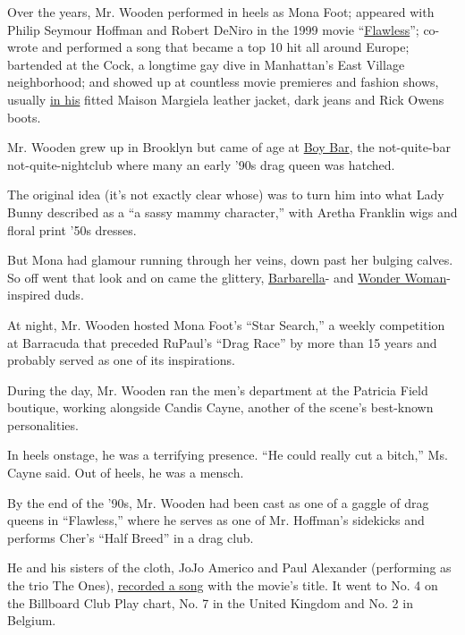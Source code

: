 Over the years, Mr. Wooden performed in heels as Mona Foot; appeared
with Philip Seymour Hoffman and Robert DeNiro in the 1999 movie
``\href{https://archive.nytimes3xbfgragh.onion/www.nytimes3xbfgragh.onion/library/film/112499flaw-film-review.html}{Flawless}'';
co-wrote and performed a song that became a top 10 hit all around
Europe; bartended at the Cock, a longtime gay dive in Manhattan's East
Village neighborhood; and showed up at countless movie premieres and
fashion shows, usually
\href{https://www.instagram.com/p/B-GGYGwjffJ/}{in his} fitted Maison
Margiela leather jacket, dark jeans and Rick Owens boots.

Mr. Wooden grew up in Brooklyn but came of age at
\href{https://www.nytimes3xbfgragh.onion/2018/06/20/style/new-york-gay-bars-that-are-gone.html}{Boy
Bar}, the not-quite-bar not-quite-nightclub where many an early '90s
drag queen was hatched.

The original idea (it's not exactly clear whose) was to turn him into
what Lady Bunny described as a ``a sassy mammy character,'' with Aretha
Franklin wigs and floral print '50s dresses.

But Mona had glamour running through her veins, down past her bulging
calves. So off went that look and on came the glittery,
\href{https://www.instagram.com/p/B-GA4r3pJjo/}{Barbarella}- and
\href{https://www.instagram.com/p/B-Fqtz4h62D/}{Wonder Woman}-inspired
duds.

At night, Mr. Wooden hosted Mona Foot's ``Star Search,'' a weekly
competition at Barracuda that preceded RuPaul's ``Drag Race'' by more
than 15 years and probably served as one of its inspirations.

During the day, Mr. Wooden ran the men's department at the Patricia
Field boutique, working alongside Candis Cayne, another of the scene's
best-known personalities.

In heels onstage, he was a terrifying presence. ``He could really cut a
bitch,'' Ms. Cayne said. Out of heels, he was a mensch.

By the end of the '90s, Mr. Wooden had been cast as one of a gaggle of
drag queens in ``Flawless,'' where he serves as one of Mr. Hoffman's
sidekicks and performs Cher's ``Half Breed'' in a drag club.

He and his sisters of the cloth, JoJo Americo and Paul Alexander
(performing as the trio The Ones),
\href{https://www.youtube.com/watch?v=O_e5oYqNRSM}{recorded a song} with
the movie's title. It went to No. 4 on the Billboard Club Play chart,
No. 7 in the United Kingdom and No. 2 in Belgium.

